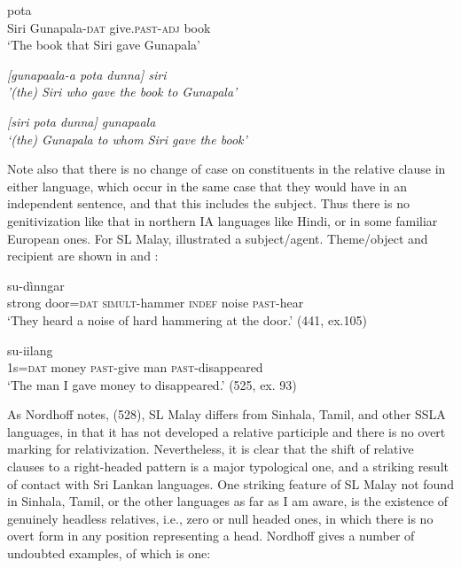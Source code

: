\ea\label{ex3.3.3} 
  pota\\
  Siri  Gunapala-\textsc{dat} give.\textsc{past}-\textsc{adj}  book \\
   `The book that Siri  gave Gunapala'
\z

\ea\label{ex3.3.4} 
  \em [gunapaala-{\dott}a pota dunna]  siri  \\ %
'(the) Siri who gave the book to Gunapala' \\
\z

\ea\label{ex3.3.5} 
\em  [siri pota dunna]  gunapaala  \\ %
   `(the) Gunapala to whom Siri gave the book'
\z


Note also that there is no change of case on constituents in the relative clause in either language, which occur in the same case that they would have in an independent sentence, and that this includes the subject. Thus there is no genitivization like that in northern IA languages like Hindi, or in some familiar European ones.
For SL Malay,  illustrated a subject/agent. Theme/object and recipient are shown in  and :
 

\ea\label{ex3.3.6}
\gll  [Kirras  pinthu=nang  arà-thatti  hathu svaara] su-dìnngar\\
strong door=\textsc{dat} \textsc{simult}-hammer \textsc{indef} noise \textsc{past}-hear\\
`They heard a noise of hard hammering at the door.' (441, ex.105)
\z




\ea\label{ex3.3.7} 
 su-iilang\\
  1s=\textsc{dat} money \textsc{past}-give  man \textsc{past}-disappeared\\
  `The man I gave money to disappeared.' (525, ex. 93)
\z


As Nordhoff notes, (528), SL Malay differs from Sinhala, Tamil, and other SSLA languages, in that it has not developed a relative participle and there is no overt marking for relativization. Nevertheless, it is clear that the shift of relative clauses to a right-headed pattern is a major typological one, and a striking result of contact with Sri Lankan languages. 
One striking feature of SL Malay not found in Sinhala, Tamil, or the other languages as far as I am aware, is the existence of genuinely headless relatives, i.e., zero or null headed ones, in which there is no overt form in any position representing a head. Nordhoff gives a number of undoubted examples, of which  is one:


